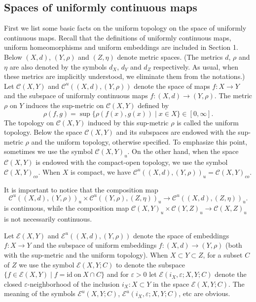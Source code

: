 \documentclass[11pt, fleqn]{amsart}
\theoremstyle{definition}
\newcommand{\cal}{\mathcal}
\newcommand{\lra}{\longrightarrow}
\newcommand{\e}{\varepsilon}
\newcommand{\id}{\mathrm{id}}
\newcommand{\E}{\mathcal E}
\begin{document}
\subsection{Spaces of uniformly continuous maps} \mbox{} 

First we list some basic facts on the uniform topology on the space of uniformly continuous maps. 
Recall that the definitions of uniformly continuous maps, uniform homeomorphisms and uniform embeddings are included in Section 1.
Below $(X, d)$, $(Y, \rho)$ and $(Z, \eta)$ denote metric spaces. (The metrics $d$, $\rho$ and $\eta$ are also denoted by the symbols $d_X$, $d_Y$ and $d_Z$ respectively. 
As usual, when these metrics are implicitly understood, we eliminate them from the notations.)  
Let ${\cal C}(X, Y)$ and ${\cal C}^u((X, d), (Y, \rho))$ 
denote the space of maps $f : X \to Y$ and 
the subspace of uniformly continuous maps $f : (X, d) \to (Y, \rho)$.  
The metric $\rho$ on $Y$ induces the sup-metric on ${\cal C}(X, Y)$ defined by 
$$\rho(f,g) = \sup \{ \rho(f(x), g(x)) \mid x \in X \} \in [0, \infty].$$ 
The topology on ${\cal C}(X, Y)$ induced by this sup-metric $\rho$ is called the uniform topology.
Below the space ${\cal C}(X,Y)$ and its subspaces are endowed with the sup-metric $\rho$ and 
the uniform topology, otherwise specified. To emphasize this point, sometimes we use the symbol ${\cal C}(X, Y)_u$. 
On the other hand, when the space ${\cal C}(X, Y)$ is endowed with the compact-open topology, 
we use the symbol ${\cal C}(X, Y)_{co}$.  
When $X$ is compact, we have ${\cal C}^u((X, d), (Y, \rho))_u = {\cal C}(X, Y)_{co}$.  

It is important to notice that the composition map 
$${\cal C}^u((X, d), (Y, \rho))_u \times {\cal C}^u((Y, \rho), (Z, \eta))_u \lra {\cal C}^u((X, d), (Z, \eta))_u.$$ 
is continuous, while the composition map ${\cal C}(X, Y)_u \times {\cal C}(Y, Z)_u \lra {\cal C}(X, Z)_u$ is not necessarily continuous. 

Let $\E(X, Y)$ and $\E^u((X, d), (Y, \rho))$ denote the space of embeddings $f : X \to Y$ 
and the subspace of uniform embeddings $f : (X, d) \to (Y, \rho)$ (both with the sup-metric and the uniform topology). 
When $X \subset Y \subset Z$, for a subset $C$ of $Z$ we use the symbol 
$\E(X, Y; C)$ to denote the subspace $\{ f \in \E(X, Y) \mid f = \id \ \text{on} \ X \cap C \}$ and  
for $\e > 0$ let $\E(i_X, \e; X, Y; C)$ denote the closed $\e$-neighborhood of the inclusion $i_X : X \subset Y$ in the space $\E(X, Y; C)$. 
The meaning of the symbols $\E^u(X, Y; C)$, $\E^u(i_X, \e; X, Y; C)$, etc are obvious. 
\end{document}
